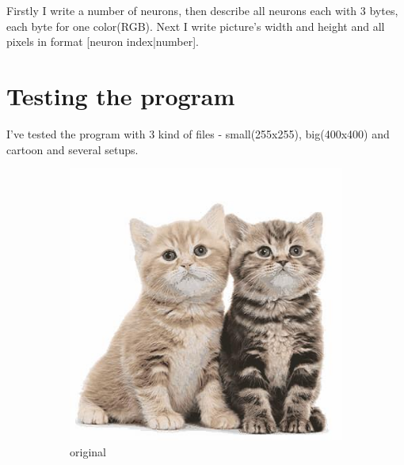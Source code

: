 \documentclass[12pt,a4paper]{article}
\begin{document}
Firstly I write a number of neurons, then describe all neurons each with 3 bytes, each byte for one color(RGB). Next I write picture's width and height and all pixels in format [neuron index|number].

\section{Testing the program}
I've tested the program with 3 kind of files - small(255x255), big(400x400) and cartoon and several setups. 
    
\begin{figure}[H]
    \centering %
\begin{subfigure}{0.25\textwidth}
  \includegraphics[width=\linewidth]{images/big/original}
  \caption{original}
  \label{fig:1}
\end{subfigure}\hfil %
\begin{subfigure}{0.25\textwidth}

\end{subfigure}
\end{figure}
\end{document}
